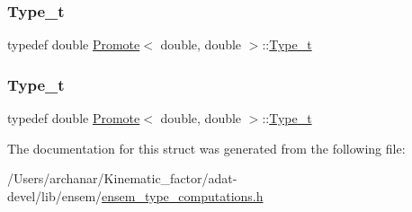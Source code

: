 \subsubsection{\texorpdfstring{Type\_t}{Type\_t}\hspace{0.1cm}{\footnotesize\ttfamily [2/3]}}
{\footnotesize\ttfamily typedef double \mbox{\hyperlink{structPromote}{Promote}}$<$ double, double $>$\+::\mbox{\hyperlink{structPromote_3_01double_00_01double_01_4_a1183eb3c61824b2ad80a7c7e7524974a}{Type\+\_\+t}}}

\mbox{\label{structPromote_3_01double_00_01double_01_4_a1183eb3c61824b2ad80a7c7e7524974a}} 
\subsubsection{\texorpdfstring{Type\_t}{Type\_t}\hspace{0.1cm}{\footnotesize\ttfamily [3/3]}}
{\footnotesize\ttfamily typedef double \mbox{\hyperlink{structPromote}{Promote}}$<$ double, double $>$\+::\mbox{\hyperlink{structPromote_3_01double_00_01double_01_4_a1183eb3c61824b2ad80a7c7e7524974a}{Type\+\_\+t}}}



The documentation for this struct was generated from the following file\+:\begin{DoxyCompactItemize}
\item 
/\+Users/archanar/\+Kinematic\+\_\+factor/adat-\/devel/lib/ensem/\mbox{\hyperlink{adat-devel_2lib_2ensem_2ensem__type__computations_8h}{ensem\+\_\+type\+\_\+computations.\+h}}\end{DoxyCompactItemize}
